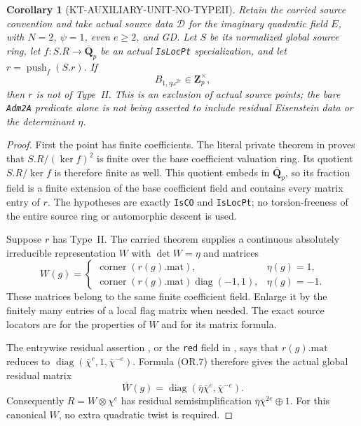 \documentclass[11pt,a4paper]{article}
\newtheorem{corollary}[theorem]{Corollary}
\theoremstyle{definition}
\begin{document}
\begin{corollary}[KT-AUXILIARY-UNIT-NO-TYPEII]
Retain the carried source convention and take actual
source data $\mathcal D$ for the imaginary quadratic
field $E$, with $N=2$, $\psi=1$, even $e\ge2$, and
GD.  Let $S$ be its normalized global source ring,
let $f:S.R\to\overline{\mathbf Q}_p$ be an actual
\texttt{IsLocPt} specialization, and let
$r=\operatorname{push}_f(S.r)$.
If
\[
                     B_{1,\eta\omega^{2e}}
                              \in\mathbf Z_p^\times,     \tag{OR.6}
\]
then $r$ is not of Type~II.
This is an exclusion of actual source points;
the bare \texttt{Adm2A} predicate alone is not
being asserted to include residual Eisenstein
data or the determinant $\eta$.
\end{corollary}

\begin{proof}
First the point has finite coefficients.
The literal private theorem 
in 
proves that $S.R/(\ker f)^2$ is finite over the
base coefficient valuation ring.  Its quotient
$S.R/\ker f$ is therefore finite as well.  This
quotient embeds in $\overline{\mathbf Q}_p$, so
its fraction field is a finite extension of the
base coefficient field and contains every matrix
entry of $r$.  The hypotheses are exactly
\texttt{IsCO} and \texttt{IsLocPt}; no
torsion-freeness of the entire source ring or
automorphic descent is used.

Suppose $r$ has Type~II.  The carried
 theorem supplies a
continuous absolutely irreducible representation
$W$ with $\det W=\eta$ and matrices
\[
 W(g)=
 \begin{cases}
  \operatorname{corner}(r(g).\mathrm{mat}),&\eta(g)=1,\\
  \operatorname{corner}(r(g).\mathrm{mat})
                   \operatorname{diag}(-1,1),&\eta(g)=-1.
 \end{cases}                                               \tag{OR.7}
\]
These matrices belong to the same finite
coefficient field.  Enlarge it by the finitely
many entries of a local flag matrix when needed.
The exact source locators are
for the properties of $W$ and
for its matrix formula.

The entrywise residual assertion
, or the
\texttt{red} field in
, says that
$r(g).\mathrm{mat}$ reduces to
$\operatorname{diag}(\bar\chi^e,1,\bar\chi^{-e})$.
Formula (OR.7) therefore gives the actual global
residual matrix
\[
       \bar W(g)=
           \operatorname{diag}(\bar\eta\bar\chi^e,
                                      \bar\chi^{-e}).     \tag{OR.8}
\]
Consequently $R=W\otimes\chi^e$ has residual
semisimplification $\bar\eta\bar\chi^{2e}\oplus1$.
For this canonical $W$, no extra quadratic twist
is required.


\end{proof}
\end{document}
